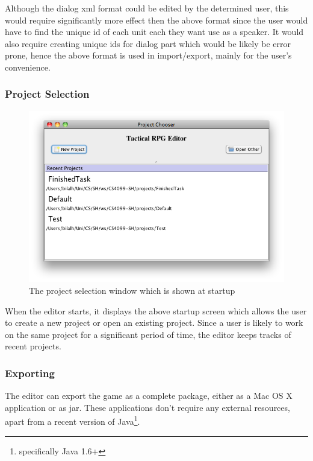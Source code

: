 Although the dialog xml format could be edited by the determined user, this would require significantly more effect then the above format since the user would have to find the unique id  of each unit each they want use as a speaker. It would also require creating unique ids for dialog part which would be likely be error prone, hence the above format is used in import/export, mainly for the user's convenience.

\subsubsection{Project Selection}
\begin{figure}[htbp]
	\centering
		\includegraphics[width=1.05\textwidth]{figures/editor/Project_Selection.png}
	\caption{The project selection window which is shown at startup}
	\label{fig:figures_editor_Project_Selection}
\end{figure}

When the editor starts, it displays the above startup screen which allows the user to create a new project or open an existing project.  Since a user is likely to work on the same project for a significant period of time, the editor keeps tracks of recent projects. 

\clearpage
\subsubsection{Exporting}
\label{ssub:exporting}

The editor can export the game as a complete package, either as a Mac OS X application or as jar. These applications don't require any external resources, apart from a recent version of Java\footnote{specifically Java 1.6+}.

